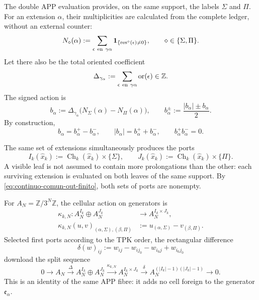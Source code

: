 The double APP evaluation provides, on the same support, the labels
\(\Sigma\) and \(\Pi\). For an extension \(\alpha\), their multiplicities
are calculated from the complete ledger, without an external counter:
\begin{equation}
\label{eq:pdfv2-cor-multiplicidades-hojas}
 N_\diamond(\alpha):=
 \sum_{\epsilon\ {\rm en}\ \gamma\alpha}
 \mathbf1_{\{\operatorname{res}^{\diamond}(\epsilon)\neq0\}},
 \qquad \diamond\in\{\Sigma,\Pi\}.
\end{equation}
Let there also be the total oriented coefficient
\[
 \Delta_{\gamma_\alpha}:=
 \sum_{\epsilon\ {\rm en}\ \gamma\alpha}\operatorname{or}(\epsilon)
 \in\mathbb Z.
\]
The signed action is
\begin{equation}
\label{eq:pdfv2-cor-b-alpha}
 b_\alpha:=\Delta_{\gamma_\alpha}
 \bigl(N_\Sigma(\alpha)-N_\Pi(\alpha)\bigr),
 \qquad
 b_\alpha^\pm:=\frac{|b_\alpha|\pm b_\alpha}{2}.
\end{equation}
By construction,
\begin{equation}
\label{eq:pdfv2-cor-b-identidades}
 b_\alpha=b_\alpha^+-b_\alpha^-,\qquad
 |b_\alpha|=b_\alpha^++b_\alpha^-,\qquad
 b_\alpha^+b_\alpha^-=0.
\end{equation}

The same set of extensions simultaneously produces the ports
\begin{equation}
\label{eq:pdfv2-cor-puertos-comunes}
 I_k(\widehat x_k):=
 \operatorname{Ch}_k(\widehat x_k)\times\{\Sigma\},
 \qquad
 J_k(\widehat x_k):=
 \operatorname{Ch}_k(\widehat x_k)\times\{\Pi\}.
\end{equation}
A visible leaf is not assumed to contain more prolongations than the other:
each surviving extension is evaluated on both leaves of the same support.
By \eqref{eq:continuo-comun-out-finito}, both sets of ports are
nonempty.

For \(A_N=\mathbb Z/3^N\mathbb Z\), the cellular action on generators is
\begin{equation}
\label{eq:pdfv2-cor-kappa-celda}
 \begin{aligned}
 \kappa_{k,N}:A_N^{I_k}\oplus A_N^{J_k}
 &\longrightarrow A_N^{I_k\times J_k},\\
 \kappa_{k,N}(u,v)_{(\alpha,\Sigma),(\beta,\Pi)}
 &:=u_{(\alpha,\Sigma)}-v_{(\beta,\Pi)}.
 \end{aligned}
\end{equation}
Selected first ports according to the TPK order, the rectangular difference
\begin{equation}
\label{eq:pdfv2-cor-delta-celda}
 \delta(w)_{ij}:=w_{ij}-w_{ij_0}-w_{i_0j}+w_{i_0j_0}
\end{equation}
download the split sequence
\begin{equation}
\label{eq:pdfv2-cor-sucesion-celda}
 0\longrightarrow A_N\xrightarrow{\Delta}
 A_N^{I_k}\oplus A_N^{J_k}
 \xrightarrow{\kappa_{k,N}}A_N^{I_k\times J_k}
 \xrightarrow{\delta}A_N^{(|I_k|-1)(|J_k|-1)}
 \longrightarrow0.
\end{equation}
This is an identity of the same APP fibre: it adds no cell foreign to the
generator \(\mathfrak e_\alpha\).


